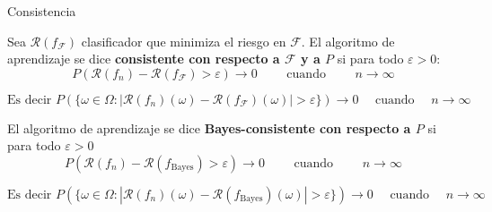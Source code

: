 \documentclass[aspectratio=169, 10pt]{beamer}
\begin{document}
\begin{frame}{Consistencia}

    \begin{enumerate}
      {\large
    \item  Sea $\mathcal{R}(f_{\mathcal{F}})$ clasificador que minimiza el riesgo en $\mathcal{F}$. El algoritmo de aprendizaje se dice 
    \textbf{consistente con respecto a $\mathcal{F}$ y a $P$} si para todo $\varepsilon>0$:
     \[
     P\left(\mathcal{R}(f_n)-\mathcal{R}(f_{\mathcal{F}})>\varepsilon\right) \rightarrow 0 \qquad \text{ cuando } \qquad n\rightarrow \infty
     \]
      }
     \pause

\[ \text{Es decir } P(\{\omega \in \Omega : |\mathcal{R}(f_n)(\omega) - \mathcal{R}(f_{\mathcal{F}})(\omega)| > \varepsilon\}) \rightarrow 0 \quad \text{ cuando } \quad n \rightarrow \infty \]
     \pause
     \bigskip
     {\large
     \item  El algoritmo de aprendizaje se dice \textbf{Bayes-consistente con respecto a $P$} si para todo $\varepsilon>0$
    \[
     P\left(\mathcal{R}(f_n)-\mathcal{R}(f_{\text{Bayes}})>\varepsilon\right) \rightarrow 0 \qquad \text{ cuando } \qquad n\rightarrow \infty
    \]
      }
      \pause
    \[ \text{Es decir } P(\{\omega \in \Omega : |\mathcal{R}(f_n)(\omega) - \mathcal{R}(f_{\text{Bayes}})(\omega)| > \varepsilon\}) \rightarrow 0 \quad \text{ cuando } \quad n \rightarrow \infty \]

     \end{enumerate}

\end{frame}
\end{document}
